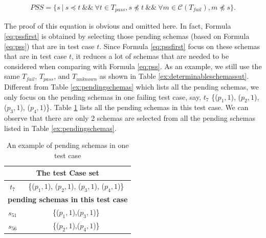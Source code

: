 \begin{equation}
\begin{aligned}\label{eq:pssfirst}
PSS=\{ s\ |\ s \preceq t\ \&\&\ \forall t \in T_{pass},  s \npreceq t  \ \&\& \  \forall m \in \mathcal{C}(T_{fail}), m \npreceq s \}.
\end{aligned}
\end{equation}

The proof of this equation is obvious and omitted here. In fact, Formula \ref{eq:pssfirst} is obtained by selecting those pending schemas (based on Formula \ref{eq:pss}) that are in test case $t$.  Since Formula \ref{eq:pssfirst} focus on these schemas that are in test case $t$, it reduces a lot of schemas that are needed to be considered when comparing with Formula \ref{eq:pss}. As an example, we still use the same  $T_{fail}$, $T_{pass}$, and $T_{unknown}$ as shown in Table \ref{ex:determinableschemassut}. Different from Table \ref{ex:pendingschemas} which lists all the pending schemas, we only focus on the pending schemas in one failing test case, say, $t_{7}$ \{($p_{1}, 1$), ($p_{2}, 1$), ($p_{3}, 1$), ($p_{4}, 1$)\}. Table \ref{ex:pendingschemasinonetestcase} lists all the pending schemas in this test case. We can observe that there are only 2 schemas are selected from all the pending schemas listed in Table \ref{ex:pendingschemas}.

\begin{table}[htbp]
  \centering
  \caption{An example of pending schemas in one test case}
  \label{ex:pendingschemasinonetestcase}
    \begin{tabular}{|c|c|} \hline
     \multicolumn{2}{|c|}{\textbf{The test Case set}} \\ \hline
   $t_{7}$ & \{($p_{1}, 1$), ($p_{2}, 1$), ($p_{3}, 1$), ($p_{4}, 1$)\}\\ \hline
        \multicolumn{2}{|c|}{\textbf{pending schemas in this test case}} \\ \hline
   $s_{51}$ & \{($p_{1}, 1$),($p_{3}, 1$)\} \\
   $s_{56}$ & \{($p_{2}, 1$),($p_{4}, 1$)\} \\ \hline
    \end{tabular}%
\end{table}


